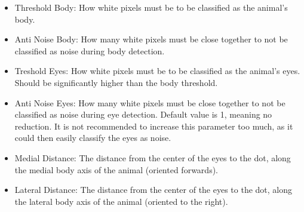 \documentclass[12pt]{article}
\begin{document}
\begin{minipage}[t]{0.45\textwidth}
	\vspace{0pt}
	\begin{itemize}
		\item Threshold Body: How white pixels must be to be classified as the animal's body.
		\item Anti Noise Body: How many white pixels must be close together to not be classified as noise during body detection.
		\item Treshold Eyes: How white pixels must be to be classified as the animal's eyes. Should be significantly higher than the body threshold.
		\item Anti Noise Eyes: How many white pixels must be close together to not be classified as noise during eye detection. Default value is 1, meaning no reduction. It is not recommended to increase this parameter too much, as it could then easily classify the eyes as noise.
		\item Medial Distance: The distance from the center of the eyes to the dot, along the medial body axis of the animal (oriented forwards).
		\item Lateral Distance: The distance from the center of the eyes to the dot, along the lateral body axis of the animal (oriented to the right).
	\end{itemize}
\end{minipage}
\hspace{\fill}
\end{document}
